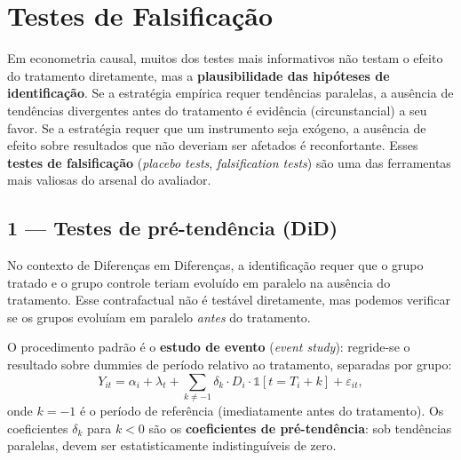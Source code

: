 \section{Testes de Falsificação}
\label{sec:falsificacao}

Em econometria causal, muitos dos testes mais informativos não testam o efeito do tratamento diretamente, mas a \textbf{plausibilidade das hipóteses de identificação}. Se a estratégia empírica requer tendências paralelas, a ausência de tendências divergentes antes do tratamento é evidência (circunstancial) a seu favor. Se a estratégia requer que um instrumento seja exógeno, a ausência de efeito sobre resultados que não deveriam ser afetados é reconfortante. Esses \textbf{testes de falsificação} (\textit{placebo tests}, \textit{falsification tests}) são uma das ferramentas mais valiosas do arsenal do avaliador.

\subsection*{1 — Testes de pré-tendência (DiD)}

No contexto de Diferenças em Diferenças, a identificação requer que o grupo tratado e o grupo controle teriam evoluído em paralelo na ausência do tratamento. Esse contrafactual não é testável diretamente, mas podemos verificar se os grupos evoluíam em paralelo \textit{antes} do tratamento.

O procedimento padrão é o \textbf{estudo de evento} (\textit{event study}): regride-se o resultado sobre dummies de período relativo ao tratamento, separadas por grupo:
\begin{equation}
  Y_{it} = \alpha_i + \lambda_t + \sum_{k \neq -1} \delta_k \cdot D_i \cdot \mathds{1}[t = T_i + k] + \varepsilon_{it},
  \label{eq:event_study}
\end{equation}
onde $k = -1$ é o período de referência (imediatamente antes do tratamento). Os coeficientes $\delta_k$ para $k < 0$ são os \textbf{coeficientes de pré-tendência}: sob tendências paralelas, devem ser estatisticamente indistinguíveis de zero.


